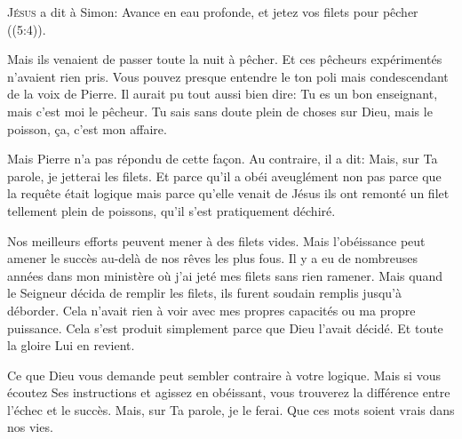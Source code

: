 \jrnlmonth





\lettrine{J}{ésus} a dit à Simon:
 \Og Avance en eau profonde, et jetez vos filets pour pêcher \Fg{}
 ((5:4)).

Mais ils venaient de passer toute la nuit à pêcher.
 Et ces pêcheurs expérimentés n'avaient rien pris.
 Vous pouvez presque entendre le ton poli mais condescendant
 de la voix de Pierre. Il aurait pu tout aussi bien dire: 
 \Og Tu es un bon enseignant, mais c'est moi le pêcheur.
 Tu sais sans doute plein de choses sur Dieu, mais le poisson,
 \c{c}a, c'est mon affaire. \Fg{}


Mais Pierre n'a pas répondu de cette fa\c{c}on.
 Au contraire, il a dit: 
 \Og Mais, sur Ta parole, je jetterai les filets. \Fg{}
 Et parce qu'il a obéi aveuglément \ocadr non pas parce que la requête était
 logique mais parce qu'elle venait de Jésus \fcadr{}
 ils ont remonté un filet tellement plein de poissons,
 qu'il s'est pratiquement déchiré.

Nos meilleurs efforts peuvent mener à des filets vides.
 Mais l'obéissance peut amener le succès au-delà de nos rêves les plus fous.
 Il y a eu de nombreuses années dans mon ministère où j'ai jeté mes filets
 sans rien ramener. Mais quand le Seigneur décida de remplir les filets,
 ils furent soudain remplis jusqu'à déborder.
 Cela n'avait rien à voir avec mes propres capacités ou ma propre puissance.
 Cela s'est produit simplement parce que Dieu l'avait décidé.
 Et toute la gloire Lui en revient.

Ce que Dieu vous demande peut sembler contraire à votre logique.
 Mais si vous écoutez Ses instructions et agissez en obéissant,
 vous trouverez la différence entre l'échec et le succès.
 \Og Mais, sur Ta parole, je le ferai. \Fg{}
 Que ces mots soient vrais dans nos vies.

\dvrule



